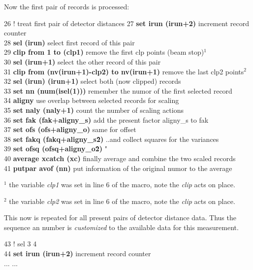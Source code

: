 \documentclass[11pt,fleqn]{book} %
\newcommand{\linespace}{\vspace{4ex}}
\newcommand{\return}{$\carriagereturn$} %
\newcommand{\sysprompt}{{\color{green}...\textgreater} ~ }
\newcommand{\enter}[1]{{\color{red} \bf #1}}
\newcommand{\expl}[1]{\hskip 0.5cm {\color{explgray} #1}}
\begin{document}
\linespace
Now the first pair of records is processed:
\begin{corollary}
26 ! treat first pair of detector distances
27 {\bf set irun (irun+2)}  \expl{increment record counter} \\
28 {\bf sel (irun)}  \expl{select first record of this pair} \\ 
29 {\bf clip from 1 to (clp1)} \expl{remove the first clp points (beam stop)$^1$} \\ 
30 {\bf sel (irun+1)}  \expl{select the other record of this pair} \\ 
31 {\bf clip from (nv(irun+1)-clp2) to nv(irun+1)} \expl{remove the last clp2 points$^2$} \\
32 {\bf sel (irun) (irun+1)} \expl{select both (now clipped) records} \\ 
33 {\bf set nn (num(isel(1)))} \expl{remember the numor of the first selected record} \\
34 {\bf aligny } \expl{use overlap between selected records for scaling} \\
35 {\bf set naly (naly+1)} \expl{count the number of scaling actions} \\
36 {\bf set fak  (fak+aligny\_s)} \expl{add the present factor aligny\_s to fak} \\
37 {\bf set ofs  (ofs+aligny\_o)} \expl{same for offset} \\
38 {\bf set fakq  (fakq+aligny\_s\^2)} \expl{..and collect squares for the variances} \\
39 {\bf set ofsq  (ofsq+aligny\_o\^2)} \expl{"} \\
40 {\bf average xcatch (xc)} \expl{finally average and combine the two scaled records} \\
41 {\bf putpar avof (nn)} \expl{put information of the original numor to the average}
\end{corollary}

$^1$ the variable \emph{clp1} was set in line 6 of the macro, note the \emph{clip} acts 
on place.

$^2$ the variable \emph{clp2} was set in line 6 of the macro, note the \emph{clip} acts 
on place.

\linespace
This now is repeated for all present pairs of detector distance data.
Thus the sequence an number is \emph{customized} to the available data for this
measurement.
\begin{corollary}
43 ! sel 3 4 \\
44 {\bf set irun (irun+2)}  \expl{increment record counter} \\
...
...
\end{corollary}
\end{document}
